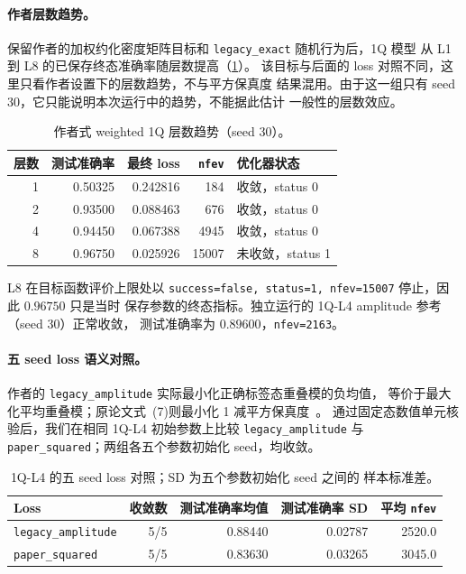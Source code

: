 \paragraph{作者层数趋势。}
保留作者的加权约化密度矩阵目标和 \texttt{legacy\_exact} 随机行为后，1Q 模型
从 L1 到 L8 的已保存终态准确率随层数提高（\cref{tab:m1-author-trend}）。
该目标与后面的 loss 对照不同，这里只看作者设置下的层数趋势，不与平方保真度
结果混用。由于这一组只有 seed 30，它只能说明本次运行中的趋势，不能据此估计
一般性的层数效应。

\begin{table}[htbp]
    \centering
    \caption{作者式 weighted 1Q 层数趋势（seed 30）。}
    \label{tab:m1-author-trend}
    \begin{tabular}{@{}rrrrl@{}}
        \toprule
        层数 & 测试准确率 & 最终 loss & \texttt{nfev} & 优化器状态 \\
        \midrule
        1 & 0.50325 & 0.242816 & 184   & 收敛，status 0 \\
        2 & 0.93500 & 0.088463 & 676   & 收敛，status 0 \\
        4 & 0.94450 & 0.067388 & 4945  & 收敛，status 0 \\
        8 & 0.96750 & 0.025926 & 15007 & 未收敛，status 1 \\
        \bottomrule
    \end{tabular}
\end{table}

L8 在目标函数评价上限处以
\texttt{success=false, status=1, nfev=15007} 停止，因此 $0.96750$ 只是当时
保存参数的终态指标。独立运行的 1Q-L4 amplitude 参考（seed 30）正常收敛，
测试准确率为 $0.89600$，\texttt{nfev=2163}。

\paragraph{五 seed loss 语义对照。}

作者的 \texttt{legacy\_amplitude} 实际最小化正确标签态重叠模的负均值，
等价于最大化平均重叠模；原论文式~(7)则最小化 1 减平方保真度~\cite{paper}。
通过固定态数值单元核验后，我们在相同 1Q-L4 初始参数上比较
\texttt{legacy\_amplitude} 与 \texttt{paper\_squared}；两组各五个参数初始化
seed，均收敛。

\begin{table}[htbp]
    \centering
    \caption{1Q-L4 的五 seed loss 对照；SD 为五个参数初始化 seed 之间的
    样本标准差。}
    \label{tab:m1-controlled-loss}
    \begin{tabular}{@{}lrrrr@{}}
        \toprule
        Loss & 收敛数 & 测试准确率均值 & 测试准确率 SD & 平均 \texttt{nfev} \\
        \midrule
        \texttt{legacy\_amplitude} & 5/5 & 0.88440 & 0.02787 & 2520.0 \\
        \texttt{paper\_squared} & 5/5 & 0.83630 & 0.03265 & 3045.0 \\
        \bottomrule
    \end{tabular}
\end{table}

